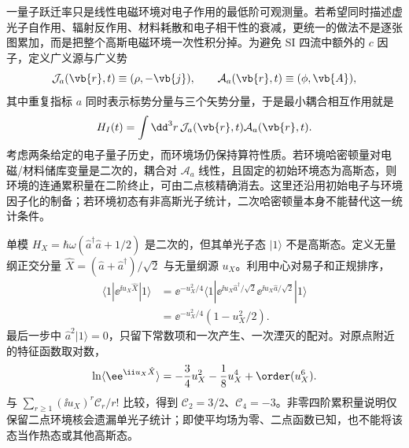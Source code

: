 一量子跃迁率只是线性电磁环境对电子作用的最低阶可观测量。若希望同时描述虚光子自作用、辐射反作用、材料耗散和电子相干性的衰减，更统一的做法不是逐张图累加，而是把整个高斯电磁环境一次性积分掉。为避免 SI 四流中额外的 $c$ 因子，定义广义源与广义势
\[
\mathcal J_a(\vb{r},t)
\equiv(\rho, -\vb{j}),
\qquad
\mathcal A_a(\vb{r},t)
\equiv(\phi,\vb{A}),
\]
其中重复指标 $a$ 同时表示标势分量与三个矢势分量，于是最小耦合相互作用就是
\begin{equation}
{
H_I(t)
=\int\dd^3r\,
\mathcal J_a(\vb{r},t)\mathcal A_a(\vb{r},t).}
\label{eq:em_linear_environment_interaction}
\end{equation}
考虑两条给定的电子量子历史，而环境场仍保持算符性质。若环境哈密顿量对电磁/材料储库变量是二次的，耦合对 $\mathcal A_a$ 线性，且固定的初始环境态为高斯态，则环境的连通累积量在二阶终止，可由二点核精确消去\cite{FeynmanVernon1963,ScheelBuhmann2008MacQED}。这里还沿用初始电子与环境因子化的制备；若环境初态有非高斯光子统计，二次哈密顿量本身不能替代这一统计条件。

\begin{note}[二次哈密顿量不保证高斯初态]
单模 $H_X=\hbar\omega(\hat a^\dagger\hat a+1/2)$ 是二次的，但其单光子态 $|1\rangle$ 不是高斯态。定义无量纲正交分量 $\hat X=(\hat a+\hat a^\dagger)/\sqrt2$ 与无量纲源 $u_X$。利用中心对易子和正规排序，
\begin{align*}
 \langle1|\ee^{\ii u_X\hat X}|1\rangle
 &=\ee^{-u_X^2/4}
 \langle1|\ee^{\ii u_X\hat a^\dagger/\sqrt2}
 \ee^{\ii u_X\hat a/\sqrt2}|1\rangle\\
 &=\ee^{-u_X^2/4}(1-u_X^2/2).
\end{align*}
最后一步中 $\hat a^2|1\rangle=0$，只留下常数项和一次产生、一次湮灭的配对。对原点附近的特征函数取对数，
\begin{equation*}
 \ln\langle\ee^{\ii u_X\hat X}\rangle
 =-\frac34u_X^2-\frac18u_X^4+\order(u_X^6).
\end{equation*}
与 $\sum_{r\geq1}(\ii u_X)^r\mathcal C_r/r!$ 比较，得到 $\mathcal C_2=3/2$、$\mathcal C_4=-3$。非零四阶累积量说明仅保留二点环境核会遗漏单光子统计；即使平均场为零、二点函数已知，也不能将该态当作热态或其他高斯态。
\end{note}

